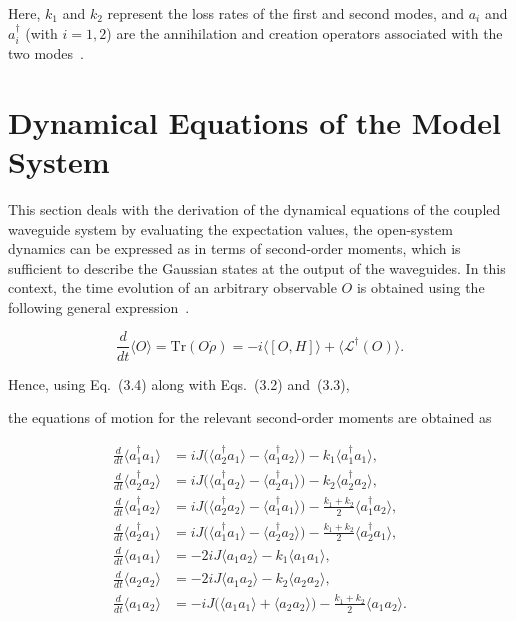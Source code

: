 Here, $k_1$ and $k_2$ represent the loss rates of the first and second modes, and $a_i$ and $a_i^\dagger$ (with $i = 1,2$) are the annihilation and creation operators associated with the two modes~\cite{BreuerPetruccione2002,Rai2010}.



\section{Dynamical Equations of the Model System}
This section deals with the derivation of the dynamical equations of the coupled
waveguide system by evaluating the expectation values, the open-system
dynamics can be expressed as in terms of second-order moments, which is
sufficient to describe the Gaussian states at the output of the waveguides.
In this context, the time evolution of an arbitrary observable $O$ is obtained using the following general expression~\cite{BreuerPetruccione2002}.

\begin{equation}
	\frac{d}{dt}\langle O\rangle
	= \mathrm{Tr}(O\dot{\rho})
	= -i\langle[O,H]\rangle + \langle \mathcal{L}^\dagger(O)\rangle .
\end{equation}

Hence, using Eq.~(3.4) along with Eqs.~(3.2) and~(3.3),

the equations of motion for the relevant second-order moments are obtained as

\begin{align}
	\frac{d}{dt}\langle a_1^\dagger a_1\rangle
	&= iJ\Big(\langle a_2^\dagger a_1\rangle-\langle a_1^\dagger a_2\rangle\Big)
	- k_1\langle a_1^\dagger a_1\rangle, \\[6pt]
	\frac{d}{dt}\langle a_2^\dagger a_2\rangle
	&= iJ\Big(\langle a_1^\dagger a_2\rangle-\langle a_2^\dagger a_1\rangle\Big)
	- k_2\langle a_2^\dagger a_2\rangle, \\[6pt]
	\frac{d}{dt}\langle a_1^\dagger a_2\rangle
	&= iJ\Big(\langle a_2^\dagger a_2\rangle-\langle a_1^\dagger a_1\rangle\Big)
	-\frac{k_1+k_2}{2}\langle a_1^\dagger a_2\rangle, \\[6pt]
	\frac{d}{dt}\langle a_2^\dagger a_1\rangle
	&= iJ\Big(\langle a_1^\dagger a_1\rangle-\langle a_2^\dagger a_2\rangle\Big)
	-\frac{k_1+k_2}{2}\langle a_2^\dagger a_1\rangle, \\[10pt]
	\frac{d}{dt}\langle a_1 a_1\rangle
	&= -2iJ\langle a_1 a_2\rangle
	- k_1\langle a_1 a_1\rangle, \\[6pt]
	\frac{d}{dt}\langle a_2 a_2\rangle
	&= -2iJ\langle a_1 a_2\rangle
	- k_2\langle a_2 a_2\rangle, \\[6pt]
	\frac{d}{dt}\langle a_1 a_2\rangle
	&= -iJ\Big(\langle a_1 a_1\rangle+\langle a_2 a_2\rangle\Big)
	-\frac{k_1+k_2}{2}\langle a_1 a_2\rangle.
\end{align}


